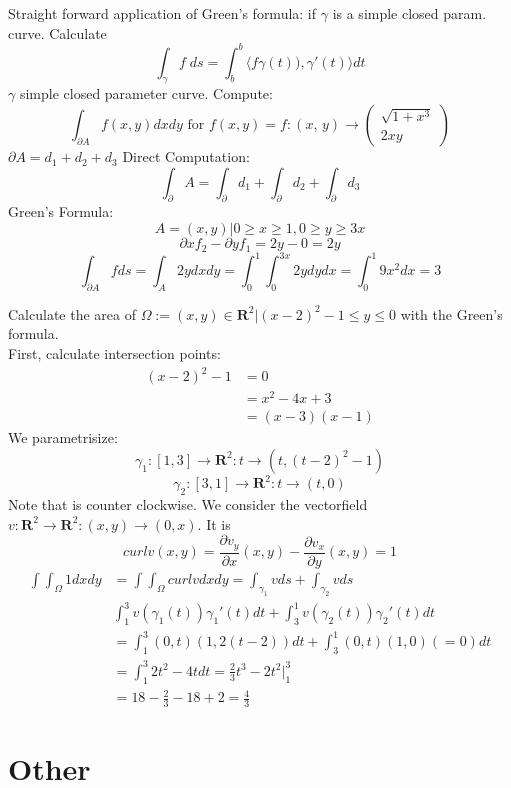 \documentclass[8pt]{extarticle}
\newcommand{\R}{{\mathbb R}}
\newcommand{\ra}{{\rightarrow}}
\def\R{\mathbf{R}}
\def\BoxStart{\begin{tcolorbox}[colback=blue!5!white,colframe=blue!75!black]}
\def\BoxEnd{\end{tcolorbox}}
\begin{document}
\begin{multicols*}{3}
\BoxStart
Straight forward application of Green's formula: if $\gamma$ is a simple closed param. curve. Calculate
$$ \int_\gamma f \; ds = \int_b^b \langle f\gamma(t)), \gamma'(t)\rangle dt$$
$\gamma$  simple closed parameter curve.
Compute:
$$\int_{\partial{A}} f(x, y) dxdy \text{ for } f(x, y) = f: (x, \, y) \ra \begin{pmatrix}
      \sqrt{1 + x^3} \\
      2xy
    \end{pmatrix}$$
$\partial{A} = d_1 + d_2 + d_3$
Direct Computation:
$$\int_\partial{A} = \int_\partial{d_1} + \int_\partial{d_2} + \int_\partial{d_3}$$
Green's Formula:
$$A = {(x, y) | 0 \geq x \geq 1, 0 \geq y \geq 3x}$$
$$\partial{x}f_2 - \partial{y}f_1 = 2y - 0 = 2y$$
$$\int_{\partial{A}} f ds = \int_A 2y dx dy = \int_0^1 \int_0^{3x} 2y dydx = \int_0^1 9x^2 dx = 3$$
\BoxEnd
\BoxStart
Calculate the area of $\Omega := {(x, y) \in \R^2 | (x-2)^2 - 1 \le y \le 0}$ with the Green's formula. \\
First, calculate intersection points:
  \begin{align*}
	(x - 2)^2 - 1 &= 0 \\
			&= x^2 - 4x + 3 \\
			&= (x - 3) (x - 1)
\end{align*}
We parametrisize:
$$\gamma_1 :[1, 3] \rightarrow \R^2 : t \rightarrow (t, (t - 2)^2 - 1)$$
$$ \gamma_2 : [3, 1] \rightarrow \R^2 : t \rightarrow (t, 0)$$
Note that is counter clockwise. We consider the vectorfield $v: \R^2 \rightarrow \R^2 : (x, y) \rightarrow (0, x)$. It is
$$curl v(x, y) = \frac{\partial{v_y}}{\partial{x}} (x, y) - \frac{\partial{v_x}}{\partial{y}} (x, y) = 1$$
\begin{align*}
	\int \int_\Omega 1 dx dy &= \int \int_{\Omega} curl v dx dy = \int_{\gamma_1} v ds + \int_{\gamma_2} v ds \\
				&\int_1^3 v(\gamma_1(t)) \gamma_1'(t) dt + \int_3^1 v(\gamma_2(t)) \gamma_2'(t) dt\\
 				&= \int_1^3 (0, t) (1, 2(t-2)) dt + \int_3^1 (0, t) (1, 0) (=0) dt \\
				&= \int_1^3 2t^2 - 4t dt = \frac{2}{3} t^3 - 2t^2 |_1^3 \\
				&= 18 - \frac{2}{3} - 18 + 2 = \frac{4}{3}
\end{align*}
\BoxEnd

\newpage{}
\section{Other}


\end{multicols*}
\end{document}
